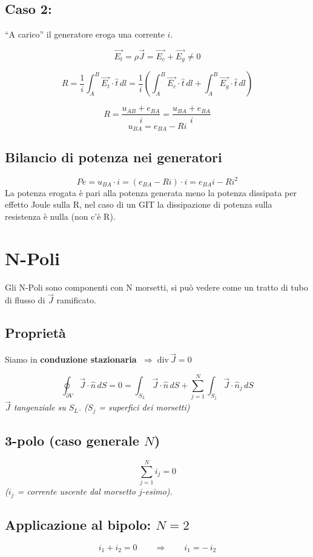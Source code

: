 \subsection{Caso 2:}
“A carico” il generatore eroga una corrente $i$.

\[
\vec{E_t} = \rho \vec{J} = \vec{E_c} + \vec{E_g} \neq 0
\]

\[
R = \frac{1}{i} \int_A^B \vec{E_t} \cdot \hat{t}\, dl 
  = \frac{1}{i} \left( \int_A^B \vec{E_c} \cdot \hat{t}\, dl 
  + \int_A^B \vec{E_g} \cdot \hat{t}\, dl \right)
\]

\[
R = \frac{u_{AB} + e_{BA}}{i}
  = \frac{u_{BA} + e_{BA}}{i}
\]
\[
u_{BA} = e_{BA} - Ri
\]

\subsection{Bilancio di potenza nei generatori}
    \[
        Pe = u_{BA} \cdot i = (e_{BA} - Ri)\cdot i = e_{BA}i - Ri^2
    \]
    La potenza erogata è pari alla potenza generata meno la potenza dissipata per effetto Joule sulla R, nel caso di un GIT la dissipazione di potenza sulla resistenza è nulla (non c'è R).
\section{N-Poli}
    Gli N-Poli sono componenti con N morsetti, si può vedere come un tratto di tubo di flusso di $\vec{J}$ ramificato.
    \subsection{Proprietà}
        Siamo in \textbf{conduzione stazionaria} $\;\Rightarrow\; \mathrm{div}\,\vec{J}=0$ 

\[
\oint_{\partial V}\vec{J}\cdot\hat{n}\,dS=0
= \int_{S_L}\vec{J}\cdot\hat{n}\,dS
  + \sum_{j=1}^{N}\int_{S_j}\vec{J}\cdot\hat{n}_j\,dS
\]
\emph{$\vec{J}$ tangenziale su $S_L$. \;($S_j$ = superfici dei \textit{morsetti})}

\subsection*{3-polo (caso generale $N$)}
\[
\sum_{j=1}^{N} i_j = 0
\]
\emph{($i_j$ = corrente uscente dal morsetto $j$-esimo).}

\subsection*{Applicazione al bipolo: $N=2$}
\[
i_1 + i_2 = 0
\qquad\Longrightarrow\qquad
i_1 = -\,i_2
\]

